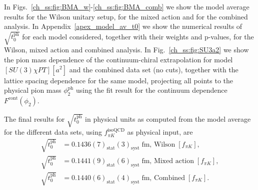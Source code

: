 In Figs.~\ref{ch_ss:fig:BMA_w}-\ref{ch_ss:fig:BMA_comb} we show the model average results for the Wilson unitary setup, for the mixed action and for the combined analysis. In Appendix~\ref{apex_model_av_t0} we show the numerical results of $\sqrt{t_0^{\textrm{ph}}}$ for each model considered, together with their weights and p-values, for the Wilson, mixed action and combined analysis. In Fig.~\ref{ch_ss:fig:SU3a2} we show the pion mass dependence of the continuum-chiral extrapolation for model $[SU(3)\chi PT][a^2]$ and the combined data set (no cuts), together with the lattice spacing dependence for the same model, projecting all points to the physical pion mass $\phi_2^{\textrm{ph}}$ using the fit result for the continuum dependence $F^{\textrm{cont}}(\phi_2)$.

The final results for $\sqrt{t_0^{\textrm{ph}}}$ in physical units as computed from the model average for the different data sets, using $f_{\pi K}^{\textrm{isoQCD}}$ as physical input, are
\begin{align}
\label{ch_ss:eq:t0ph_w}
\sqrt{t_0^{\textrm{ph}}}&=0.1436(7)_{\textrm{stat}}(3)_{\textrm{syst}}\;\textrm{fm, Wilson}\;[f_{\pi K}], \\
\label{ch_ss:eq:t0ph_tm}
\sqrt{t_0^{\textrm{ph}}}&=0.1441(9)_{\textrm{stat}}(6)_{\textrm{syst}}\;\textrm{fm, Mixed action}\;[f_{\pi K}], \\
\label{ch_ss:eq:t0ph_c}
\sqrt{t_0^{\textrm{ph}}}&=0.1440(6)_{\textrm{stat}}(4)_{\textrm{syst}}\;\textrm{fm, Combined}\;[f_{\pi K}].
\end{align}

